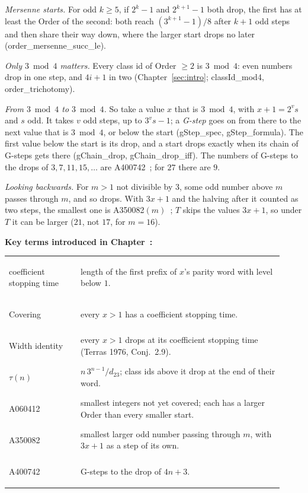 \documentclass[11pt,a4paper,titlepage]{article}
\makeatletter
\newcommand{\boxhere}[1]{\leavevmode
  \Hy@raisedlink{\hyper@anchorstart{box:#1}\hyper@anchorend}}
\newcommand{\termlink}[2]{\hyperlink{term:#1}{#2}}
\newif\ifpaper
\newcommand{\lean}[1]{\textsf{#1}}
\newenvironment{wordbox}
  {\par\ifpaper\vspace*{\fill}\vspace{\bigskipamount}\else\medskip\fi
   \noindent\begin{lrbox}{\wordboxbin}%
   \begin{minipage}{\dimexpr\linewidth-2\fboxsep-2\fboxrule\relax}\small
   \textbf{Key terms introduced in Chapter~\thesection:}\par\smallskip
   \begin{tabular}{@{}>{\bfseries\boldmath\raggedright\arraybackslash}p{0.24\linewidth}p{0.68\linewidth}@{}}}
  {\end{tabular}\end{minipage}\end{lrbox}%
   \fcolorbox{black!40}{black!3}{\usebox{\wordboxbin}}\par\ifpaper\else\medskip\fi}
\makeatother
\begin{document}
\emph{Mersenne starts.} For odd $k \ge 5$, if $2^k - 1$ and $2^{k+1} - 1$ both drop, the first has at least
the Order of the second: both reach $(3^{k+1} - 1)/8$ after $k + 1$ odd steps and then share
their way down, where the larger start drops no later
(\lean{order\_mersenne\_succ\_le}).

\emph{Only $3 \bmod 4$ matters.}\label{sec:mod4} Every class id of Order $\ge 2$ is
$3 \bmod 4$: even numbers drop in one step, and $4i+1$ in two
(Chapter~\ref{sec:intro}; \lean{classId\_mod4}, \lean{order\_trichotomy}).

\emph{From $3 \bmod 4$ to $3 \bmod 4$.} So take a value $x$ that is $3 \bmod 4$, with
$x + 1 = 2^v s$ and $s$ odd. It takes $v$ odd steps, up to $3^v s - 1$; a
\emph{G-step} goes on from there to the next value that is $3 \bmod 4$, or below the
start (\lean{gStep\_spec}, \lean{gStep\_formula}). The first value below the start is
its drop, and a start drops exactly when its chain of G-steps gets there
(\lean{gChain\_drop}, \lean{gChain\_drop\_iff}). The numbers of G-steps to the drops of
$3, 7, 11, 15, \dots$ are A400742~\cite{OEIS_A400742}; for $27$
there are $9$.

\nopagebreak
\emph{Looking backwards.} For $m > 1$ not divisible by $3$, some odd number above
$m$ passes through $m$, and so drops. With $3x+1$ and the halving after it counted as
two steps, the smallest one is A350082$(m)$~\cite{OEIS_A350082};
$T$ skips the values $3x+1$, so under $T$ it can be larger ($21$, not $17$, for $m = 16$).

\begin{wordbox}
\boxhere{cst}coefficient stopping time\index{coefficient stopping time@\termlink{cst}{coefficient stopping time}|textbf} & length of the first prefix of $x$'s parity word
  with level below $1$. \\
\boxhere{covering}Covering\index{covering@\termlink{covering}{Covering}|textbf} & every $x > 1$ has a coefficient stopping time. \\
\boxhere{widthidentity}Width identity\index{width identity@\termlink{widthidentity}{Width identity}|textbf} & every $x > 1$ drops at its coefficient stopping time
  (Terras 1976, Conj.~2.9). \\
\boxhere{tau}$\tau(n)$\index{tau(n)@\termlink{tau}{$\tau(n)$}|textbf} & $n\,3^{n-1}/d_{23}$; class ids above it drop at the end of their
  word. \\
A060412\index{OEIS!A060412} & smallest integers not yet covered; each has a larger Order than every smaller start. \\
A350082\index{OEIS!A350082} & smallest larger odd number passing through $m$, with $3x+1$ as a step of its own. \\
A400742\index{OEIS!A400742} & G-steps to the drop of $4n+3$.
\end{wordbox}
\end{document}
